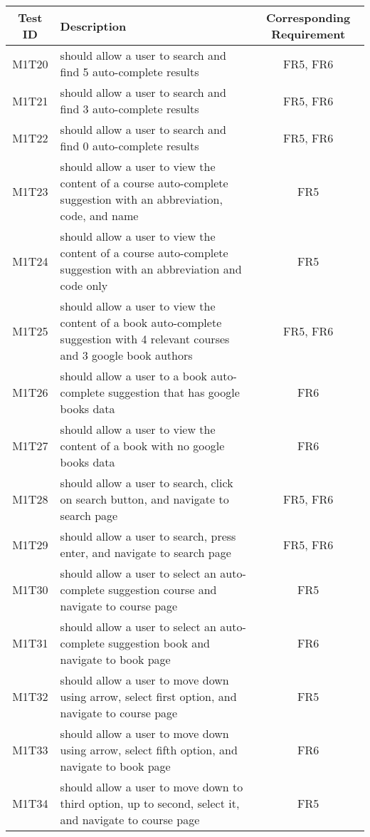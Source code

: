 \documentclass[fullpage]{article}
\begin{document}
\begin{table}[H]
\flushleft
\begin{tabular}{|c|p{8.5cm}|c|}
\hline
 \rowcolor{lightgray}
\textbf{Test ID} &\textbf{Description} &\textbf{Corresponding Requirement}\\
\hline
M1T20 & should allow a user to search and find 5 auto-complete results & FR5, FR6 \\
\hline
M1T21 & should allow a user to search and find 3 auto-complete results & FR5, FR6 \\
\hline
M1T22 & should allow a user to search and find 0 auto-complete results & FR5, FR6 \\
\hline
M1T23 & should allow a user to view the content of a course auto-complete suggestion with an abbreviation, code, and name & FR5 \\
\hline
M1T24 & should allow a user to view the content of a course auto-complete suggestion with an abbreviation and code only & FR5 \\
\hline
M1T25 & should allow a user to view the content of a book auto-complete suggestion with 4 relevant courses and 3 google book authors & FR5, FR6 \\
\hline
M1T26 & should allow a user to a book auto-complete suggestion that has google books data & FR6 \\
\hline
M1T27 & should allow a user to view the content of a book with no google books data & FR6 \\
\hline
M1T28 & should allow a user to search, click on search button, and navigate to search page & FR5, FR6 \\
\hline
M1T29 & should allow a user to search, press enter, and navigate to search page & FR5, FR6 \\
\hline
M1T30 & should allow a user to select an auto-complete suggestion course and navigate to course page & FR5 \\
\hline
M1T31 & should allow a user to select an auto-complete suggestion book and navigate to book page & FR6 \\
\hline
M1T32 & should allow a user to move down using arrow, select first option, and navigate to course page & FR5 \\
\hline
M1T33 & should allow a user to move down using arrow, select fifth option, and navigate to book page & FR6 \\
\hline
M1T34 & should allow a user to move down to third option, up to second, select it, and navigate to course page & FR5 \\
\hline
\end{tabular}
\end{table}
\end{document}
